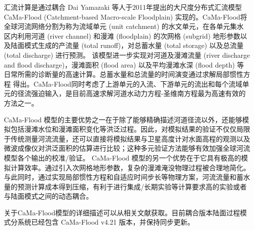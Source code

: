 汇流计算是通过耦合 Dai Yamazaki 等人于2011年提出的大尺度分布式汇流模型 CaMa-Flood (Catchment-based Macro-scale Floodplain) 实现的\citep{yamazaki2011physically}。CaMa-Flood将全球河流网络分割为称为流域单元 (unit catchment) 的水文单元，在各单元集水区内利用河道 (river channel) 和漫滩 (floodplain) 的次网格 (subgrid) 地形参数以及陆面模式生成的产流量 (total runoff)，对总蓄水量 (total storage) 以及总流量 (total discharge) 进行预测。
该模型进一步实现对河道及漫滩流量 (river discharge and flood discharge)，漫滩面积 (flood area) 以及平均漫滩水深 (flood depth) 等日常所需的诊断量的高速计算。总蓄水量和总流量的时间演变通过求解局部惯性方程 \citep{bates2010} 得出。CaMa-Flood同时考虑了上游单元的入流、下游单元的流出和每个流域单元的径流强迫输入，是目前高速求解河道水动力方程-圣维南方程最为高速有效的方法之一。


CaMa-Flood 模型的主要优势之一在于除了能够精确描述河道径流以外，还能够模拟包括漫滩水位和漫滩面积变化等洪泛过程。因此，对模拟结果的验证不仅仅局限于传统测量河流流量，还可以直接将模拟结果与卫星高度计对水面高程的观测以及微波成像仪对洪泛面积的估算进行比较；这种多元验证方法能够有效加强全球河流模型各个输出的校准/验证\citep{yamazaki2012adjustment,yamazaki2012analysis}。
CaMa-Flood 模型的另一个优势在于它具有极高的模拟计算效率。通过引入次网格地形参数，复杂的漫滩淹没物理过程被合理地简化。与此同时，通过实现局部惯性方程和自适应时间步长等物理方案\citep{bates2010}，河流流量和蓄水量的预测计算成本得到压缩，有利于进行集成/长期实验等计算要求高的实验或者与陆面模式之间的动态耦合。


关于CaMa-Flood模型的详细描述可以从相关文献获取\citep{yamazaki2011physically,yamazaki2013improving,yamazaki2014regional,yamazaki2014development}。目前耦合版本陆面过程模式分系统已经包含 CaMa-Flood v4.21 版本，并保持同步更新。

